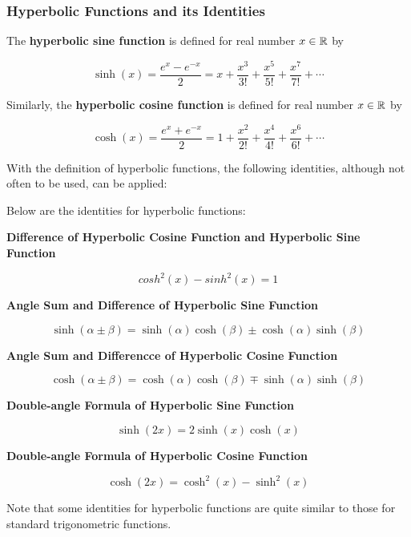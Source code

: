 \documentclass[a4paper,12pt]{article}
\begin{document}
\subsubsection{Hyperbolic Functions and its Identities}
\begin{dft}
  The \textbf{hyperbolic sine function} is defined for real number $x\in\mathbb{R}$ by

  $$\sinh(x)=\frac{e^{x}-e^{-x}}{2}=x+\frac{x^{3}}{3!}+\frac{x^{5}}{5!}+\frac{x^{7}}{7!}+\cdots$$

  Similarly, the \textbf{hyperbolic cosine function} is defined for real number $x\in\mathbb{R}$ by

  $$\cosh(x)=\frac{e^{x}+e^{-x}}{2}=1+\frac{x^{2}}{2!}+\frac{x^{4}}{4!}+\frac{x^{6}}{6!}+\cdots$$
\end{dft}\n

With the definition of hyperbolic functions, the following identities, although not often to be used, can be applied:\n

\begin{pst}
  Below are the identities for hyperbolic functions:

  \begin{alist}
    \item \textbf{Difference of Hyperbolic Cosine Function and Hyperbolic Sine Function}

    $$cosh^{2}(x)-sinh^{2}(x)=1$$

    \item \textbf{Angle Sum and Difference of Hyperbolic Sine Function}

    $$\sinh(\alpha\pm\beta)=\sinh(\alpha)\cosh(\beta)\pm\cosh(\alpha)\sinh(\beta)$$

    \item \textbf{Angle Sum and Differencce of Hyperbolic Cosine Function}

    $$\cosh(\alpha\pm\beta)=\cosh(\alpha)\cosh(\beta)\mp\sinh(\alpha)\sinh(\beta)$$

    \item \textbf{Double-angle Formula of Hyperbolic Sine Function}

    $$\sinh(2x)=2\sinh(x)\cosh(x)$$

    \item \textbf{Double-angle Formula of Hyperbolic Cosine Function}

    $$\cosh(2x)=\cosh^{2}(x)-\sinh^{2}(x)$$
  \end{alist}
\end{pst}\n

Note that some identities for hyperbolic functions are quite similar to those for standard trigonometric functions.
\end{document}
